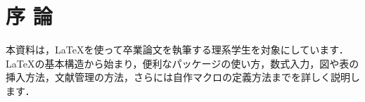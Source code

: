 \chapter{序 論}
本資料は，LaTeXを使って卒業論文を執筆する理系学生を対象にしています．LaTeXの基本構造から始まり，便利なパッケージの使い方，数式入力，図や表の挿入方法，文献管理の方法，さらには自作マクロの定義方法までを詳しく説明します．
